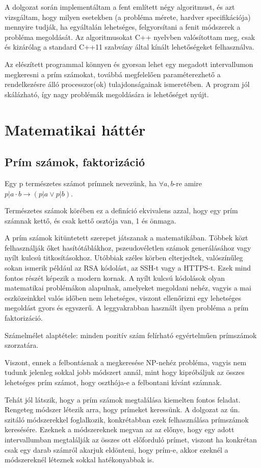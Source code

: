\documentclass[twoside, a4paper, 12pt]{article}
\begin{document}
A dolgozat során implementáltam a fent említett négy algoritmust, és azt vizsgáltam, hogy milyen esetekben (a probléma mérete, hardver specifikációja) mennyire tudják, ha egyáltalán lehetséges, felgyorsítani a fenit módszerek a probléma megoldását. Az algoritmusokat C++ nyelvben valósítottam meg, csak és kizárólag a standard C++11 szabvány által kínált lehetőségeket felhasználva.\par
Az elészített programmal könnyen és gyorsan lehet egy megadott intervallumon megkeresni a prím számokat, továbbá megfelelően paraméterezhető a rendelkezésre álló processzor(ok) tulajdonságainak ismeretében. A program jól skálázható, így nagy problémák megoldására is lehetőséget nyújt.

\clearpage
\section{Matematikai háttér}

\subsection{Prím számok, faktorizáció}

\begin{definition} Egy p természetes számot prímnek nevezünk, ha \(\forall a,b\)-re amire \(p|a \cdot b \rightarrow (p|a \vee p|b)\). \end{definition}
Természetes számok körében ez a definíció ekvivalens azzal, hogy egy prím számnak kettő, és csak kettő osztója van, 1 és önmaga. \par
A prím számok kitüntetett szerepet játszanak a matematikában. Többek közt felhasználják őket hasítótáblákhoz, pszeudovéletlen számok generálásához vagy nyílt kulcsú titkosításokhoz. Utóbbiak széles körben elterjedtek, valószínűleg sokan ismerik például az RSA kódolást, az SSH-t vagy a HTTPS-t. Ezek mind fontos részét képezik a modern kornak. A nyílt kulcsú kódolások olyan matematikai problémákon alapulnak, amelyeket megoldani nehéz, vagyis a mai eszközeinkkel valós időben nem lehetséges, viszont ellenőrizni egy lehetséges megoldást gyors és egyszerű. A leggyakrabban használt ilyen probléma a prím faktorizáció. \par
Számelmélet alaptétele: minden pozitív szám felírható egyértelműen prímszámok szorzatára. \par
Viszont, ennek a felbontásnak a megkeresése NP-nehéz probléma, vagyis nem tudunk jelenleg sokkal jobb módszert annál, mint hogy kipróbáljuk az összes lehetséges prím számot, hogy oszthója-e a felbontani kívánt számnak.\par
Tehát jól látszik, hogy a prím számok megtalálása  kiemelten fontos feladat. Rengeteg módszer létezik arra, hogy prímeket keressünk. A dolgozat az ún. szitáló módszerekkel foglalkozik, konkrétabban ezek felhasználása prímszámok keresésére. Ezeknek a módszereknek megvan az az előnye, hogy egy adott intervallumban megtalálják az összes ott előforduló prímet, viszont ha konkrétan csak egy darab számról akarjuk eldönteni, hogy prím-e, akkor ezeknél a módszereknél léteznek sokkal hatékonyabbak is.
\end{document}
